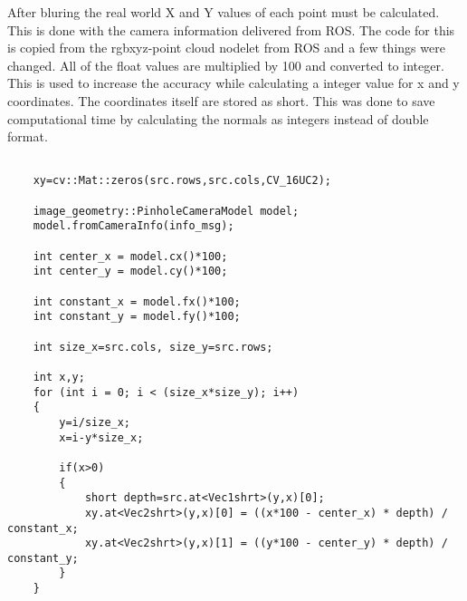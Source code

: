 After bluring the real world X and Y values of each point must be calculated. This is done with the camera information delivered 
from ROS. The code for this is copied from the rgbxyz-point cloud nodelet from ROS and a few things were changed.
All of the float values are multiplied by 100 and converted to integer. This is used to increase the accuracy while
calculating a integer value for x and y coordinates. The coordinates itself are stored as short. This was done to save
computational time by calculating the normals as integers instead of double format.
 
{
\tiny
\begin{lstlisting}

	xy=cv::Mat::zeros(src.rows,src.cols,CV_16UC2);

	image_geometry::PinholeCameraModel model;
	model.fromCameraInfo(info_msg);

	int center_x = model.cx()*100;					
	int center_y = model.cy()*100;					

	int constant_x = model.fx()*100;
	int constant_y = model.fy()*100;

	int size_x=src.cols, size_y=src.rows;

	int x,y;
	for (int i = 0; i < (size_x*size_y); i++)
	{
		y=i/size_x;
		x=i-y*size_x;

		if(x>0)
		{
			short depth=src.at<Vec1shrt>(y,x)[0];
			xy.at<Vec2shrt>(y,x)[0] = ((x*100 - center_x) * depth) / constant_x;
			xy.at<Vec2shrt>(y,x)[1] = ((y*100 - center_y) * depth) / constant_y;
		}
	}
\end{lstlisting}
}
% 
% 
% 
% 
% 
% 
% 




